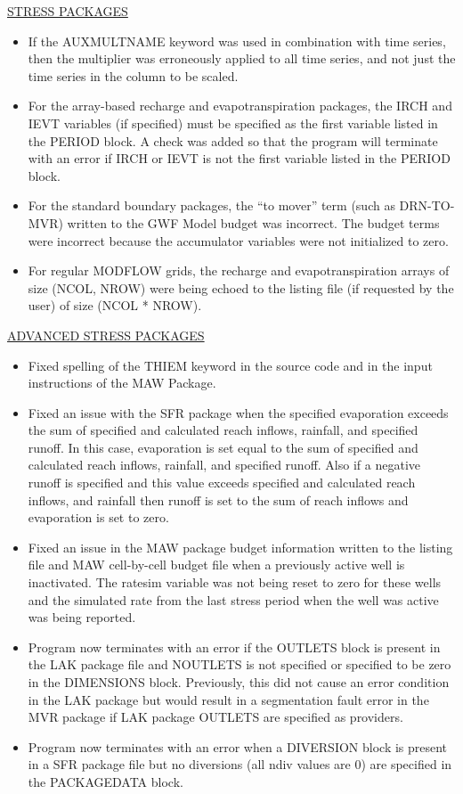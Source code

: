 \begin{itemize}
	\underline{STRESS PACKAGES}
	\begin{itemize}
		\item If the AUXMULTNAME keyword was used in combination with time series, then the multiplier was erroneously applied to all time series, and not just the time series in the column to be scaled.  
		\item For the array-based recharge and evapotranspiration packages, the IRCH and IEVT variables (if specified) must be specified as the first variable listed in the PERIOD block.  A check was added so that the program will terminate with an error if IRCH or IEVT is not the first variable listed in the PERIOD block.
		\item For the standard boundary packages, the ``to mover'' term (such as DRN-TO-MVR) written to the GWF Model budget was incorrect.  The budget terms were incorrect because the accumulator variables were not initialized to zero. 
		\item For regular MODFLOW grids, the recharge and evapotranspiration arrays of size (NCOL, NROW) were being echoed to the listing file (if requested by the user) of size (NCOL * NROW). 
	\end{itemize}
	
	\underline{ADVANCED STRESS PACKAGES}
	\begin{itemize}
		\item Fixed spelling of the THIEM keyword in the source code and in the input instructions of the MAW Package.
		\item Fixed an issue with the SFR package when the specified evaporation exceeds the sum of specified and calculated reach inflows, rainfall, and specified runoff. In this case, evaporation is set equal to the sum of specified and calculated reach inflows, rainfall, and specified runoff. Also if a negative runoff is specified and this value exceeds specified and calculated reach inflows, and rainfall then runoff is set to the sum of reach inflows and evaporation is set to zero.
		\item Fixed an issue in the MAW package budget information written to the listing file and MAW cell-by-cell budget file when a previously active well is inactivated. The ratesim variable was not being reset to zero for these wells and the simulated rate from the last stress period when the well was active was being reported.
		\item Program now terminates with an error if the OUTLETS block is present in the LAK package file and NOUTLETS is not specified or specified to be zero in the DIMENSIONS block.  Previously, this did not cause an error condition in the LAK package but would result in a segmentation fault error in the MVR package if LAK package OUTLETS are specified as providers.
		\item Program now terminates with an error when a DIVERSION block is present in a SFR package file but no diversions (all ndiv values are 0) are specified in the PACKAGEDATA block. 
	\end{itemize}
	

\end{itemize}
